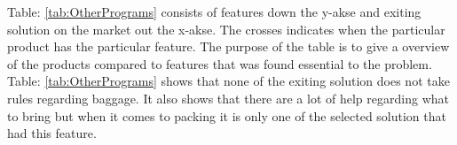 Table: \ref{tab:OtherPrograms} consists of features down the y-akse and exiting solution on the market out the x-akse. The crosses indicates when the particular product has the particular feature. The purpose of the table is to give a overview of the products compared to features that was found essential to the problem.
Table: \ref{tab:OtherPrograms} shows that none of the exiting solution does not take rules regarding baggage. It also shows that there are a lot of help regarding what to bring but when it comes to packing it is only one of the selected solution that had this feature.